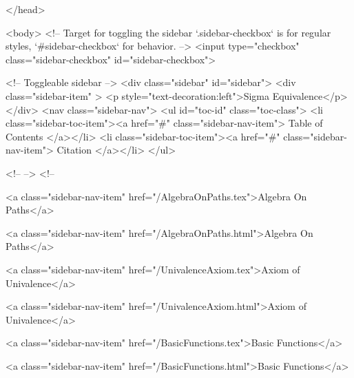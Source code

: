   
</head>




  <body>
    <!-- Target for toggling the sidebar `.sidebar-checkbox` is for regular
     styles, `#sidebar-checkbox` for behavior. -->
<input type="checkbox" class="sidebar-checkbox" id="sidebar-checkbox">

<!-- Toggleable sidebar -->
<div class="sidebar" id="sidebar">
  <div class="sidebar-item" >
    <p style="text-decoration:left">Sigma Equivalence</p>
  </div>
  <nav class="sidebar-nav">
    <ul id="toc-id" class="toc-class">
  <li class="sidebar-toc-item"><a href="#" class="sidebar-nav-item"> Table of Contents </a></li>
  <li class="sidebar-toc-item"><a href="#" class="sidebar-nav-item"> Citation </a></li>
</ul>


    <!--  -->
    <!-- 
      
    
      
    
      
    
      
        
      
    
      
        
          <a class="sidebar-nav-item" href="/AlgebraOnPaths.tex">Algebra On Paths</a>
        
      
    
      
        
          <a class="sidebar-nav-item" href="/AlgebraOnPaths.html">Algebra On Paths</a>
        
      
    
      
        
          <a class="sidebar-nav-item" href="/UnivalenceAxiom.tex">Axiom of Univalence</a>
        
      
    
      
        
          <a class="sidebar-nav-item" href="/UnivalenceAxiom.html">Axiom of Univalence</a>
        
      
    
      
        
          <a class="sidebar-nav-item" href="/BasicFunctions.tex">Basic Functions</a>
        
      
    
      
        
          <a class="sidebar-nav-item" href="/BasicFunctions.html">Basic Functions</a>
        
      
    
      
        
